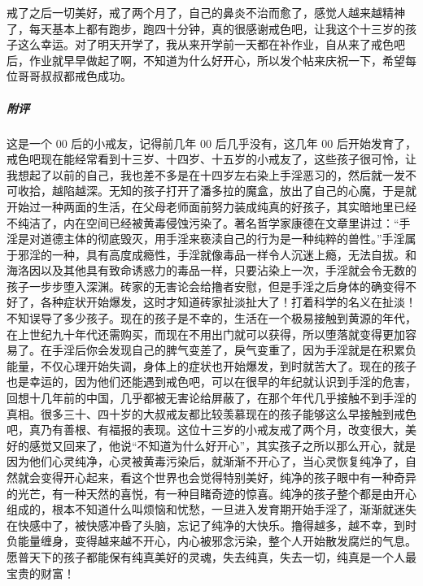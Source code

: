 \begin{case}
    戒了之后一切美好，戒了两个月了，自己的鼻炎不治而愈了，感觉人越来越精神了，每天基本上都有跑步，跑四十分钟，真的很感谢戒色吧，让我这个十三岁的孩子这么幸运。对了明天开学了，我从来开学前一天都在补作业，自从来了戒色吧后，作业就早早做起了啊，不知道为什么好开心，所以发个帖来庆祝一下，希望每位哥哥叔叔都戒色成功。
    \subparagraph{附评} 这是一个 00 后的小戒友，记得前几年 00 后几乎没有，这几年 00 后开始发育了，戒色吧现在能经常看到十三岁、十四岁、十五岁的小戒友了，这些孩子很可怜，让我想起了以前的自己，我也差不多是在十四岁左右染上手淫恶习的，然后就一发不可收拾，越陷越深。无知的孩子打开了潘多拉的魔盒，放出了自己的心魔，于是就开始过一种两面的生活，在父母老师面前努力装成纯真的好孩子，其实暗地里已经不纯洁了，内在空间已经被黄毒侵蚀污染了。著名哲学家康德在文章里讲过：“手淫是对道德主体的彻底毁灭，用手淫来亵渎自己的行为是一种纯粹的兽性。”手淫属于邪淫的一种，具有高度成瘾性，手淫就像毒品一样令人沉迷上瘾，无法自拔。和海洛因以及其他具有致命诱惑力的毒品一样，只要沾染上一次，手淫就会令无数的孩子一步步堕入深渊。砖家的无害论会给撸者安慰，但是手淫之后身体的确变得不好了，各种症状开始爆发，这时才知道砖家扯淡扯大了！打着科学的名义在扯淡！不知误导了多少孩子。现在的孩子是不幸的，生活在一个极易接触到黄源的年代，在上世纪九十年代还需购买，而现在不用出门就可以获得，所以堕落就变得更加容易了。在手淫后你会发现自己的脾气变差了，戾气变重了，因为手淫就是在积累负能量，不仅心理开始失调，身体上的症状也开始爆发，到时就苦大了。现在的孩子也是幸运的，因为他们还能遇到戒色吧，可以在很早的年纪就认识到手淫的危害，回想十几年前的中国，几乎都被无害论给屏蔽了，在那个年代几乎接触不到手淫的真相。很多三十、四十岁的大叔戒友都比较羡慕现在的孩子能够这么早接触到戒色吧，真乃有善根、有福报的表现。这位十三岁的小戒友戒了两个月，改变很大，美好的感觉又回来了，他说“不知道为什么好开心”，其实孩子之所以那么开心，就是因为他们心灵纯净，心灵被黄毒污染后，就渐渐不开心了，当心灵恢复纯净了，自然就会变得开心起来，看这个世界也会觉得特别美好，纯净的孩子眼中有一种奇异的光芒，有一种天然的喜悦，有一种目睹奇迹的惊喜。纯净的孩子整个都是由开心组成的，根本不知道什么叫烦恼和忧愁，一旦进入发育期开始手淫了，渐渐就迷失在快感中了，被快感冲昏了头脑，忘记了纯净的大快乐。撸得越多，越不幸，到时负能量缠身，变得越来越不开心，内心被邪念污染，整个人开始散发腐烂的气息。愿普天下的孩子都能保有纯真美好的灵魂，失去纯真，失去一切，纯真是一个人最宝贵的财富！
\end{case}

